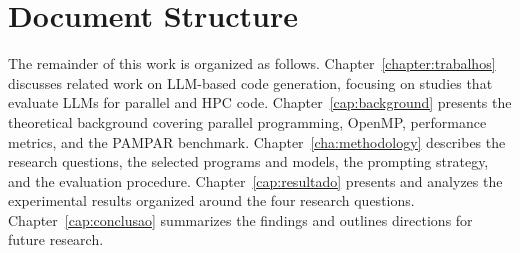 \section{Document Structure}
\label{sec:structure}

The remainder of this work is organized as follows. 
Chapter~\ref{chapter:trabalhos} discusses related work on LLM-based code generation, focusing on studies that evaluate LLMs for parallel and HPC code. 
Chapter~\ref{cap:background} presents the theoretical background covering parallel programming, OpenMP, performance metrics, and the PAMPAR benchmark. 
Chapter~\ref{cha:methodology} describes the research questions, the selected programs and models, the prompting strategy, and the evaluation procedure. 
Chapter~\ref{cap:resultado} presents and analyzes the experimental results organized around the four research questions. 
Chapter~\ref{cap:conclusao} summarizes the findings and outlines directions for future research.